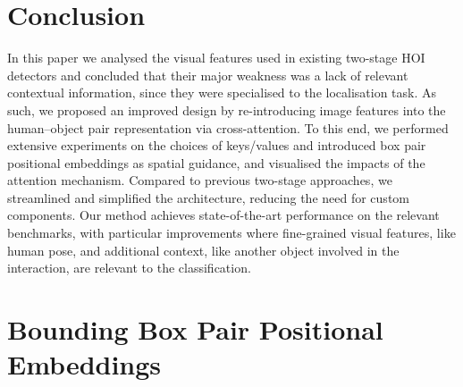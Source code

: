 \documentclass[10pt,twocolumn,letterpaper]{article}
\begin{document}
\section{Conclusion}

In this paper we analysed the visual features used in existing two-stage HOI detectors and concluded that their major weakness was a lack of relevant contextual information, since they were specialised to the localisation task. As such, we proposed an improved design by re-introducing image features into the human--object pair representation via cross-attention. To this end, we performed extensive experiments on the choices of keys/values and introduced box pair positional embeddings as spatial guidance, and visualised the impacts of the attention mechanism. Compared to previous two-stage approaches, we streamlined and simplified the architecture, reducing the need for custom components. Our method achieves state-of-the-art performance on the relevant benchmarks, with particular improvements where fine-grained visual features, like human pose, and additional context, like another object involved in the interaction, are relevant to the classification.

\newpage

{\small


}

\newpage
\appendix

\section{Bounding Box Pair Positional Embeddings}
\end{document}
